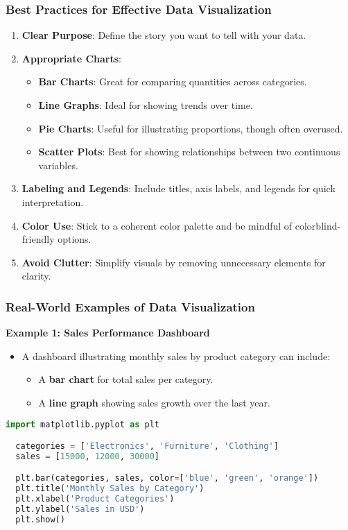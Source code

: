 \documentclass[aspectratio=169]{beamer}
\begin{document}
\begin{frame}[fragile]
  \frametitle{Best Practices for Effective Data Visualization}
  
  \begin{enumerate}
    \item \textbf{Clear Purpose}: Define the story you want to tell with your data.
    \item \textbf{Appropriate Charts}:
      \begin{itemize}
        \item \textbf{Bar Charts}: Great for comparing quantities across categories.
        \item \textbf{Line Graphs}: Ideal for showing trends over time.
        \item \textbf{Pie Charts}: Useful for illustrating proportions, though often overused.
        \item \textbf{Scatter Plots}: Best for showing relationships between two continuous variables.
      \end{itemize}
    \item \textbf{Labeling and Legends}: Include titles, axis labels, and legends for quick interpretation.
    \item \textbf{Color Use}: Stick to a coherent color palette and be mindful of colorblind-friendly options.
    \item \textbf{Avoid Clutter}: Simplify visuals by removing unnecessary elements for clarity.
  \end{enumerate}
\end{frame}

\begin{frame}[fragile]
  \frametitle{Real-World Examples of Data Visualization}

  \textbf{Example 1: Sales Performance Dashboard}
  \begin{itemize}
    \item A dashboard illustrating monthly sales by product category can include:
    \begin{itemize}
      \item A \textbf{bar chart} for total sales per category.
      \item A \textbf{line graph} showing sales growth over the last year.
    \end{itemize}
  \end{itemize}

  \begin{lstlisting}[language=Python]
  import matplotlib.pyplot as plt

  categories = ['Electronics', 'Furniture', 'Clothing']
  sales = [15000, 12000, 30000]

  plt.bar(categories, sales, color=['blue', 'green', 'orange'])
  plt.title('Monthly Sales by Category')
  plt.xlabel('Product Categories')
  plt.ylabel('Sales in USD')
  plt.show()
  \end{lstlisting}

\end{frame}
\end{document}
